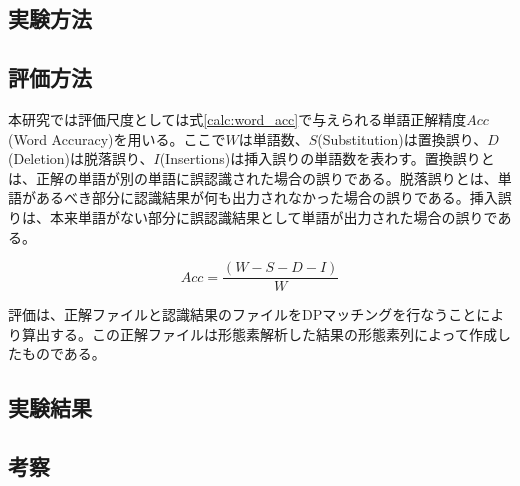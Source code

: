 \subsection{実験方法}
\subsection{評価方法}
本研究では評価尺度としては式\ref{calc:word_acc}で与えられる単語正解精度$Acc$(Word Accuracy)を用いる。ここで$W$は単語数、$S$(Substitution)は置換誤り、$D$(Deletion)は脱落誤り、$I$(Insertions)は挿入誤りの単語数を表わす。置換誤りとは、正解の単語が別の単語に誤認識された場合の誤りである。脱落誤りとは、単語があるべき部分に認識結果が何も出力されなかった場合の誤りである。挿入誤りは、本来単語がない部分に誤認識結果として単語が出力された場合の誤りである。

\begin{equation}
\label{calc:word_acc}
Acc=\frac{(W-S-D-I)}{W}
\end{equation}

          
 評価は、正解ファイルと認識結果のファイルをDPマッチングを行なうことにより算出する。この正解ファイルは形態素解析した結果の形態素列によって作成したものである。

\subsection{実験結果}
\subsection{考察}

